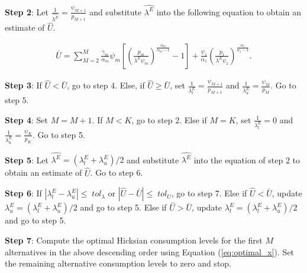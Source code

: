 \textbf{Step 2}: Let
\(\frac{1}{\hat{\lambda^E}} = \frac{\psi_{M+1}}{p_{M+1}}\) and
substitute \(\hat{\lambda^E}\) into the following equation to obtain an
estimate of \(\hat{U}\).

\begin{align}
\bar{U}=\sum_{M=2}^{M} \frac{\gamma_m}{\alpha_m}\psi_m \left[ \left( \frac{p_m}{\lambda^E \psi_m} \right)^\frac{\alpha_m}{\alpha_m-1} - 1 \right] + \frac{\psi_1}{\alpha_1}\left(\frac{p_1}{\lambda^E \psi_1} \right)^\frac{\alpha_1}{\alpha_1-1}.
\end{align}

\textbf{Step 3}: If \(\hat{U} < \bar{U}\), go to step 4. Else, if
\(\hat{U} \geq \bar{U}\), set
\(\frac{1}{\lambda_l^E}= \frac{\psi_{M+1}}{p_{M+1}}\) and
\(\frac{1}{\lambda_u^E}= \frac{\psi_{M}}{p_{M}}\). Go to step 5.

\textbf{Step 4}: Set \(M=M+1\). If \(M<K\), go to step 2. Else if
\(M=K\), set \(\frac{1}{\lambda_l^E}= 0\) and
\(\frac{1}{\lambda_u^E}= \frac{\psi_{K}}{p_{K}}\). Go to step 5.

\textbf{Step 5}: Let \(\hat{\lambda^E}= (\lambda_l^E+\lambda_u^E)/2\)
and substitute \(\hat{\lambda^E}\) into the equation of step 2 to obtain
an estimate of \(\hat{U}\). Go to step 6.

\textbf{Step 6}: If \(|\lambda_l^E-\lambda_u^E| \leq \; tol_{\lambda}\)
or \(|\hat{U}-\bar{U}| \leq \; tol_{U}\), go to step 7. Else if
\(\hat{U}<\bar{U}\), update \(\lambda^E_u= (\lambda_l^E+\lambda_u^E)/2\)
and go to step 5. Else if \(\hat{U}>\bar{U}\), update
\(\lambda^E_l= (\lambda_l^E+\lambda_u^E)/2\) and go to step 5.

\textbf{Step 7}: Compute the optimal Hicksian consumption levels for the
first \(M\) alternatives in the above descending order using Equation
(\ref{eq:optimal_x}). Set the remaining alternative consumption levels
to zero and stop.




\address{%
Patrick Lloyd-Smith\\
University of Saskatchewan\\%
Department of Agricultural and Resource Economics Room 3D34, Agriculture
Building 51 Campus Drive Saskatoon, SK S7N 5A8 Canada\\
%
\url{https://plloydsmith.github.io/}%
%
\\
}


